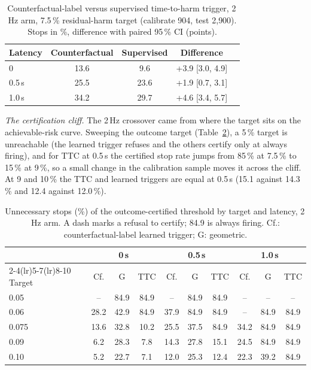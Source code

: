 \documentclass[lettersize,journal]{IEEEtran}
\begin{document}
\begin{table}[h]
\caption{Counterfactual-label versus supervised time-to-harm trigger, 2\,Hz arm,
7.5\,\% residual-harm target (calibrate 904, test 2{,}900). Stops in \%,
difference with paired 95\,\% CI (points).}
\label{tab:sup}
\centering
\scriptsize\setlength{\tabcolsep}{3pt}
\begin{tabular}{lcccc}
\toprule
Latency & Counterfactual & Supervised & Difference \\
\midrule
0 & 13.6 & 9.6 & +3.9 [3.0, 4.9] \\
0.5\,s & 25.5 & 23.6 & +1.9 [0.7, 3.1] \\
1.0\,s & 34.2 & 29.7 & +4.6 [3.4, 5.7] \\
\bottomrule
\end{tabular}
\end{table}

\emph{The certification cliff.} The 2\,Hz crossover came from where the
target sits on the achievable-risk curve. Sweeping the outcome target
(Table~\ref{tab:sweep}), a 5\,\% target is unreachable (the learned trigger
refuses and the others certify only at always firing), and for TTC at 0.5\,s
the certified stop rate jumps from 85\,\% at 7.5\,\% to 15\,\% at 9\,\%, so a
small change in the calibration sample moves it across the cliff. At 9 and
10\,\% the TTC and learned triggers are equal at 0.5\,s (15.1 against
14.3\,\% and 12.4 against 12.0\,\%).

\begin{table}[h]
\caption{Unnecessary stops (\%) of the outcome-certified threshold by target
and latency, 2\,Hz arm. A dash marks a refusal to certify; 84.9 is always
firing. Cf.: counterfactual-label learned trigger; G: geometric.}
\label{tab:sweep}
\centering
\scriptsize\setlength{\tabcolsep}{2.5pt}
\begin{tabular}{lccccccccc}
\toprule
 & \multicolumn{3}{c}{0\,s} & \multicolumn{3}{c}{0.5\,s} & \multicolumn{3}{c}{1.0\,s} \\
\cmidrule(lr){2-4}\cmidrule(lr){5-7}\cmidrule(lr){8-10}
Target & Cf. & G & TTC & Cf. & G & TTC & Cf. & G & TTC \\
\midrule
0.05 & -- & 84.9 & 84.9 & -- & 84.9 & 84.9 & -- & -- & -- \\
0.06 & 28.2 & 42.9 & 84.9 & 37.9 & 84.9 & 84.9 & -- & 84.9 & 84.9 \\
0.075 & 13.6 & 32.8 & 10.2 & 25.5 & 37.5 & 84.9 & 34.2 & 84.9 & 84.9 \\
0.09 & 6.2 & 28.3 & 7.8 & 14.3 & 27.8 & 15.1 & 24.5 & 84.9 & 84.9 \\
0.10 & 5.2 & 22.7 & 7.1 & 12.0 & 25.3 & 12.4 & 22.3 & 39.2 & 84.9 \\
\bottomrule
\end{tabular}
\end{table}
\end{document}
